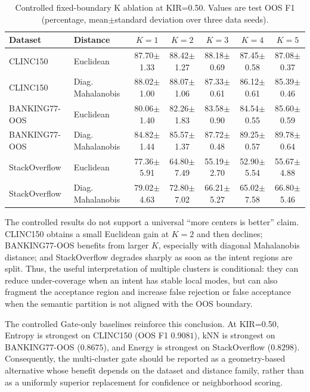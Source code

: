 \documentclass[11pt]{article}
\begin{document}
\begin{table}[t]
\centering
\small
\setlength{\tabcolsep}{4pt}
\renewcommand{\arraystretch}{1.05}
\begin{tabular}{llccccc}
\toprule
\textbf{Dataset} & \textbf{Distance} & $K=1$ & $K=2$ & $K=3$ & $K=4$ & $K=5$ \\
\midrule
CLINC150 & Euclidean & 87.70$\pm$1.33 & 88.42$\pm$1.27 & 88.18$\pm$0.69 & 87.45$\pm$0.58 & 87.08$\pm$0.37 \\
CLINC150 & Diag. Mahalanobis & 88.02$\pm$1.00 & 88.07$\pm$1.06 & 87.33$\pm$0.61 & 86.12$\pm$0.61 & 85.39$\pm$0.46 \\
BANKING77-OOS & Euclidean & 80.06$\pm$1.40 & 82.26$\pm$1.83 & 83.58$\pm$0.90 & 84.54$\pm$0.55 & 85.60$\pm$0.59 \\
BANKING77-OOS & Diag. Mahalanobis & 84.82$\pm$1.44 & 85.57$\pm$1.37 & 87.72$\pm$0.48 & 89.25$\pm$0.57 & 89.78$\pm$0.64 \\
StackOverflow & Euclidean & 77.36$\pm$5.91 & 64.80$\pm$7.49 & 55.19$\pm$2.70 & 52.90$\pm$5.54 & 55.67$\pm$4.88 \\
StackOverflow & Diag. Mahalanobis & 79.02$\pm$4.63 & 72.80$\pm$7.02 & 66.21$\pm$5.27 & 65.02$\pm$7.58 & 66.80$\pm$5.46 \\
\bottomrule
\end{tabular}
\caption{Controlled fixed-boundary K ablation at KIR=0.50. Values are test OOS F1 (percentage, mean$\pm$standard deviation over three data seeds).}
\label{tab:multicluster_k_ablation_v19}
\end{table}

The controlled results do not support a universal ``more centers is better''
claim. CLINC150 obtains a small Euclidean gain at $K=2$ and then declines;
BANKING77-OOS benefits from larger $K$, especially with diagonal Mahalanobis
distance; and StackOverflow degrades sharply as soon as the intent regions are
split. Thus, the useful interpretation of multiple clusters is conditional:
they can reduce under-coverage when an intent has stable local modes, but can
also fragment the acceptance region and increase false rejection or false
acceptance when the semantic partition is not aligned with the OOS boundary.

The controlled Gate-only baselines reinforce this conclusion. At KIR=0.50,
Entropy is strongest on CLINC150 (OOS F1 $0.9081$), kNN is strongest on
BANKING77-OOS ($0.8675$), and Energy is strongest on StackOverflow ($0.8298$).
Consequently, the multi-cluster gate should be reported as a geometry-based
alternative whose benefit depends on the dataset and distance family, rather
than as a uniformly superior replacement for confidence or neighborhood
scoring.
\end{document}
